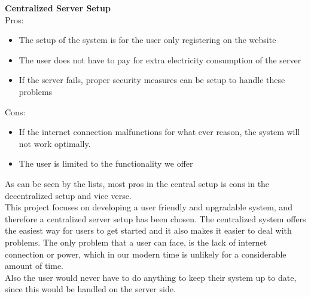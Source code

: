 \textbf{Centralized Server Setup}\\
Pros:
\begin{itemize}
	\item The setup of the system is for the user only registering on the website
	\item The user does not have to pay for extra electricity consumption of the server
	\item If the server fails, proper security measures can be setup to handle these problems
\end{itemize}

Cons:
\begin{itemize}
	\item If the internet connection malfunctions for what ever reason, the system will not work optimally.
  \item The user is limited to the functionality we offer
\end{itemize}

As can be seen by the lists, most pros in the central setup is cons in the decentralized setup and vice verse.\\
This project focuses on developing a user friendly and upgradable system, and therefore a centralized server setup has been chosen. The centralized system offers the easiest way for users to get started and it also makes it easier to deal with problems. The only problem that a user can face, is the lack of internet connection or power, which in our modern time is unlikely for a considerable amount of time.\\
Also the user would never have to do anything to keep their system up to date, since this would be handled on the server side.
